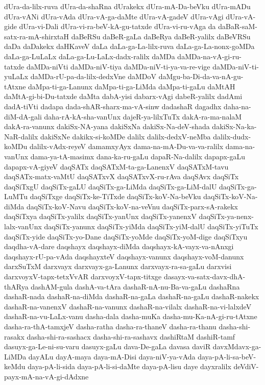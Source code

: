 {dUra-da-lilx-ruva
dUra-da-shaRna
dUrakekx
dUra-mA-Da-beVku
dUra-mADu
dUra-vANi
dUra-vAda
dUra-vA-ga-daMte
dUra-vA-gadeV
dUra-vAgi
dUra-vA-gide
dUra-vi-Dali
dUra-vi-ra-beV-kA-gu-tatxde
dUra-vi-ru-vAga
da
daBaR-saM-satx-ra-mA-shirxtaH
daBeRSu
daBeR-gaLa
daBeRya
daBeR-yalilx
daBeVRSu
daDa
daDakekx
daHKaveV
daLa
daLa-ga-La-lilx-ruva
daLa-ga-La-nonx-goMDa
daLa-ga-LuLaLx
daLa-ga-Lu-LaLx-dadx-ralilx
daMDa
daMDa-na-vA-gi-ru-tatxde
daMDa-niVti
daMDa-niV-tiya
daMDa-niV-ti-ya-va-re-vige
daMDa-niV-ti-yuLaLx
daMDa-rU-pa-da-lilx-dedxVne
daMDoV
daMgu-ba-Di-da-va-nA-gu-tAtxne
daMpa-ti-ga-Lanunx
daMpa-ti-ga-LiMda
daMpa-ti-gaLu
daMtAH
daMtA-gi-bi-Du-tatxde
daMta
dabA-yisi
dabarx-vAgi
dabeR-yalilx
dadAmi
dadA-tiVti
dadapa
dada-shAR-sharx-ma-vA-sinw
dadashaR
dagadhx
daha-na-diM-dA-gali
daha-rA-kA-sha-vanUnx
dajeR-ya-lilxTuTx
dakA-ra-ma-nalaM
dakA-ra-vanunx
dakiSx-NA-yana
dakiSxNa
dakiSx-Na-deV-shada
dakiSx-Na-ka-NaR-dalilx
dakiSxNe
dakikx-si-koMDe
dalilx
dalilx-dedxV-neMba
dalilx-dudx-koMDu
dalilx-vAdx-reyeV
damamxyAyx
dama-na-mA-Du-va-va-ralilx
dama-na-vanUnx
dama-ya-tA-masimx
dana-ka-ru-gaLu
dapaR-Na-dalilx
dapapx-gaLu
dapapx-vA-giyeV
daqSATx
daqSATxM-ta-ga-LanenxV
daqSATxM-tavu
daqSATx-matx-vaMtU
daqSATxvX
daqSATxvX-ru-rAva
daqSAvx
daqSiTx
daqSiTxgU
daqSiTx-gaLU
daqSiTx-ga-LiMda
daqSiTx-ga-LiM-dalU
daqSiTx-ga-LuMTu
daqSiTxge
daqSiTx-ke-TiTxde
daqSiTx-koV-Na-beVku
daqSiTx-koV-Na-diMda
daqSiTx-koV-Navu
daqSiTx-koV-na-veVnu
daqSiTx-parx-sA-rakekx
daqSiTxya
daqSiTx-yalilx
daqSiTx-yanUnx
daqSiTx-yanenxV
daqSiTx-ya-nenx-lalx-vanUnx
daqSiTx-yanunx
daqSiTx-yiMda
daqSiTx-yiM-dalU
daqSiTx-yiTuTx
daqSiTx-yide
daqSiTx-yo-Dane
daqSiTx-yoMde
daqSiTx-yoM-dige
daqSiTxyu
daqdha-vA-dare
daqshayx
daqshayx-diMda
daqshayx-kA-vayx-va-nAnxgi
daqshayx-rU-pa-vAda
daqshayxteV
daqshayx-vanunx
daqshayx-voM-danunx
darxSuTxM
darxvayx
darxvayx-ga-Lanunx
darxvayx-ra-sa-gaLu
darxvisi
darxvoyxV-tapx-tetxVvAR
darxvoyxV-tapx-titxge
dasayx-va-satx-davx-dhA-thARya
dashAM-gula
dashA-va-tAra
dashaR-nA-nu-Ba-va-gaLu
dashaRna
dashaR-nada
dashaR-na-diMda
dashaR-na-gaLa
dashaR-na-gaLu
dashaR-nakekx
dashaR-na-vanenxV
dashaR-na-vanunx
dashaR-na-vilalx
dashaR-na-vi-lalxdeV
dashaR-na-vu-LaLx-vanu
dasha-dala
dasha-muKa
dasha-mu-Ka-nA-gi-ru-tAtxne
dasha-ra-thA-tamxjeV
dasha-ratha
dasha-ra-thaneV
dasha-ra-thanu
dasha-shi-rasakx
dasha-shi-ra-sashacx
dasha-shi-ra-sashavx
dashiRtaM
dashiR-tamf
dasuyx-ga-Le-ni-su-varu
dasuyx-gaLu
dava-De-gaLa
davasa
daviR
davxMdavx-ga-LiMDa
dayALu
dayA-maya
daya-mA-Disi
daya-niV-ya-vAda
daya-pA-li-sa-beV-keMdu
daya-pA-li-sida
daya-pA-li-si-daMte
daya-pA-lisu
daye
dayxralilx
deVdiV-payx-mA-na-vA-gi-dAdxne
}
